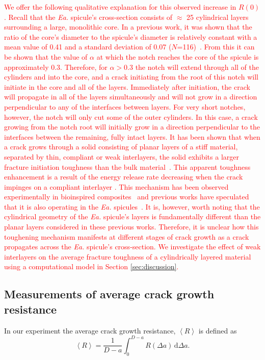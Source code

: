 \documentclass[12pt,onecolumn]{article}
\makeatletter
\newcommand{\EA}{\textit{Ea.\@}\xspace}
\makeatother
\begin{document}
\begin{bibunit}
\textcolor{red}{We offer the following qualitative explanation for this observed increase in $R(0)$. Recall that the \EA spicule's cross-section consists of $\approx$ 25 cylindrical layers surrounding a large, monolithic core. In a previous work, it was shown that the ratio of the core's diameter to the spicule's diameter is relatively constant with a mean value of 0.41 and a standard deviation of 0.07 ($N$=116)~\cite{monn2015new}. From this it can be shown that the value of $\alpha$ at which the notch reaches the core of the spicule is approximately 0.3. Therefore, for $\alpha>$0.3 the notch will extend through all of the cylinders and into the core, and a crack initiating from the root of this notch will initiate in the core and all of the layers. Immediately after initiation, the crack will propagate in all of the layers simultaneously and will not grow in a direction perpendicular to any of the interfaces between layers. For very short notches, however, the notch will only cut some of the outer cylinders. In this case, a crack growing from the notch root will initially grow in a direction perpendicular to the interfaces between the remaining, fully intact layers. It has been shown that when a crack grows through a solid consisting of planar layers of a stiff material, separated by thin, compliant or weak interlayers, the solid exhibits a larger fracture initiation toughness than the bulk material~\cite{fratzl2007hindered, kolednik2011bioinspired, kolednik2014improvements}. This apparent toughness enhancement is a result of the energy release rate decreasing when the crack impinges on a compliant interlayer \cite{fratzl2007hindered, kolednik2011bioinspired}. This mechanism has been observed experimentally in bioinspired composites~\cite{zechner2013fracture, sistaninia2018design} and previous works have speculated that it is also operating in the \EA spicules~\cite{fratzl2007hindered, kolednik2011bioinspired}. It is, however, worth noting that the cylindrical geometry of the \EA spicule's layers is fundamentally different than the planar layers considered in these previous works. Therefore, it is unclear how this toughening mechanism manifests at different stages of crack growth as a crack propagates across the \EA spicule's cross-section. We investigate the effect of weak interlayers on the average fracture toughness of a cylindrically layered material using a computational model in Section \ref{sec:discussion}.}

\subsection{Measurements of average crack growth resistance}
\label{sec:avgR}
In our experiment the average crack growth resistance, $\left< R \right>$ is defined as
%
\begin{equation}
    \label{eq:avgRdef}
    \left< R \right> =\frac{1}{D-a}\int_0^{D-a}R(\Delta a)\,\mathrm{d}\Delta a.
\end{equation}
%


\end{bibunit}
\end{document}
